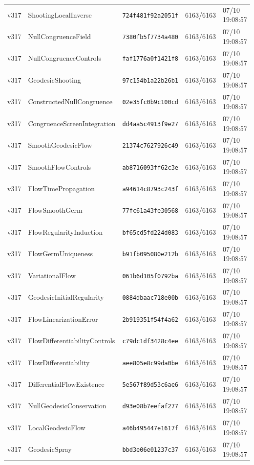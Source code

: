 \documentclass[11pt]{article}
\theoremstyle{definition}\newtheorem{deriv}{Derivação}
\begin{document}
{\begin{longtable}{@{}lllll@{}}
v317 & ShootingLocalInverse & \texttt{724f481f92a2051f} & 6163/6163 & 07/10 19:08:57 \\
v317 & NullCongruenceField & \texttt{7380fb5f7734a480} & 6163/6163 & 07/10 19:08:57 \\
v317 & NullCongruenceControls & \texttt{faf1776a0f1421f8} & 6163/6163 & 07/10 19:08:57 \\
v317 & GeodesicShooting & \texttt{97c154b1a22b26b1} & 6163/6163 & 07/10 19:08:57 \\
v317 & ConstructedNullCongruence & \texttt{02e35fc0b9c100cd} & 6163/6163 & 07/10 19:08:57 \\
v317 & CongruenceScreenIntegration & \texttt{dd4aa5c4913f9e27} & 6163/6163 & 07/10 19:08:57 \\
v317 & SmoothGeodesicFlow & \texttt{21374c7627926c49} & 6163/6163 & 07/10 19:08:57 \\
v317 & SmoothFlowControls & \texttt{ab8716093ff62c3e} & 6163/6163 & 07/10 19:08:57 \\
v317 & FlowTimePropagation & \texttt{a94614c8793c243f} & 6163/6163 & 07/10 19:08:57 \\
v317 & FlowSmoothGerm & \texttt{77fc61a43fe30568} & 6163/6163 & 07/10 19:08:57 \\
v317 & FlowRegularityInduction & \texttt{bf65cd5fd224d083} & 6163/6163 & 07/10 19:08:57 \\
v317 & FlowGermUniqueness & \texttt{b91fb095080e212b} & 6163/6163 & 07/10 19:08:57 \\
v317 & VariationalFlow & \texttt{061b6d105f0792ba} & 6163/6163 & 07/10 19:08:57 \\
v317 & GeodesicInitialRegularity & \texttt{0884dbaac718e00b} & 6163/6163 & 07/10 19:08:57 \\
v317 & FlowLinearizationError & \texttt{2b919351f54f4a62} & 6163/6163 & 07/10 19:08:57 \\
v317 & FlowDifferentiabilityControls & \texttt{c79dc1df3428c4ee} & 6163/6163 & 07/10 19:08:57 \\
v317 & FlowDifferentiability & \texttt{aee805e8c99da0be} & 6163/6163 & 07/10 19:08:57 \\
v317 & DifferentialFlowExistence & \texttt{5e567f89d53c6ae6} & 6163/6163 & 07/10 19:08:57 \\
v317 & NullGeodesicConservation & \texttt{d93e08b7eefaf277} & 6163/6163 & 07/10 19:08:57 \\
v317 & LocalGeodesicFlow & \texttt{a46b495447e1617f} & 6163/6163 & 07/10 19:08:57 \\
v317 & GeodesicSpray & \texttt{bbd3e06e01237c37} & 6163/6163 & 07/10 19:08:57 \\

\end{longtable}}
\end{document}
